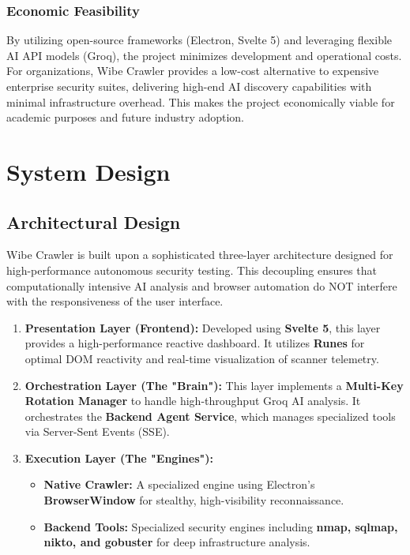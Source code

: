 \documentclass[12pt,oneside,a4paper]{book}
\begin{document}
\subsection{Economic Feasibility}
By utilizing open-source frameworks (Electron, Svelte 5) and leveraging flexible AI API models (Groq), the project minimizes development and operational costs. For organizations, Wibe Crawler provides a low-cost alternative to expensive enterprise security suites, delivering high-end AI discovery capabilities with minimal infrastructure overhead. This makes the project economically viable for academic purposes and future industry adoption.

\chapter{System Design}
\label{chap:systemdesign}

\section{Architectural Design}
\label{sec:architecturaldesign}

Wibe Crawler is built upon a sophisticated three-layer architecture designed for high-performance autonomous security testing. This decoupling ensures that computationally intensive AI analysis and browser automation do NOT interfere with the responsiveness of the user interface.

\begin{enumerate}
  \item \textbf{Presentation Layer (Frontend):} Developed using \textbf{Svelte 5}, this layer provides a high-performance reactive dashboard. It utilizes \textbf{Runes} for optimal DOM reactivity and real-time visualization of scanner telemetry.
  
  \item \textbf{Orchestration Layer (The "Brain"):} This layer implements a \textbf{Multi-Key Rotation Manager} to handle high-throughput Groq AI analysis. It orchestrates the \textbf{Backend Agent Service}, which manages specialized tools via Server-Sent Events (SSE).
  
  \item \textbf{Execution Layer (The "Engines"):} 
  \begin{itemize}
    \item \textbf{Native Crawler:} A specialized engine using Electron's \textbf{BrowserWindow} for stealthy, high-visibility reconnaissance.
    \item \textbf{Backend Tools:} Specialized security engines including \textbf{nmap, sqlmap, nikto, and gobuster} for deep infrastructure analysis.
  \end{itemize}
\end{enumerate}
\end{document}
